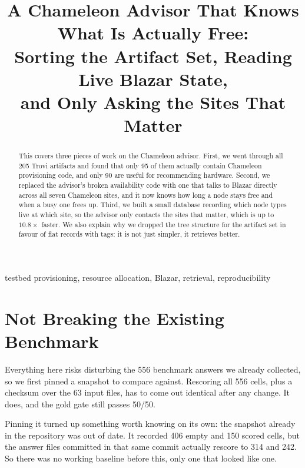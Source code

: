 \documentclass[conference]{IEEEtran}
\begin{document}
\title{A Chameleon Advisor That Knows What Is Actually Free:\\
Sorting the Artifact Set, Reading Live Blazar State,\\
and Only Asking the Sites That Matter}

\author{
}

\maketitle

\begin{abstract}
This covers three pieces of work on the Chameleon advisor. First, we went
through all 205 Trovi artifacts and found that only 95 of them actually contain
Chameleon provisioning code, and only 90 are useful for recommending hardware.
Second, we replaced the advisor's broken availability code with one that talks
to Blazar directly across all seven Chameleon sites, and it now knows how long
a node stays free and when a busy one frees up. Third, we built a small
database recording which node types live at which site, so the advisor only
contacts the sites that matter, which is up to $10.8\times$ faster. We also
explain why we dropped the tree structure for the artifact set in favour of
flat records with tags: it is not just simpler, it retrieves better.
\end{abstract}

\begin{IEEEkeywords}
testbed provisioning, resource allocation, Blazar, retrieval, reproducibility
\end{IEEEkeywords}

\section{Not Breaking the Existing Benchmark}

Everything here risks disturbing the 556 benchmark answers we already
collected, so we first pinned a snapshot to compare against. Rescoring all 556
cells, plus a checksum over the 63 input files, has to come out identical after
any change. It does, and the gold gate still passes 50/50.

Pinning it turned up something worth knowing on its own: the snapshot already
in the repository was out of date. It recorded 406 empty and 150 scored cells,
but the answer files committed in that same commit actually rescore to 314 and
242. So there was no working baseline before this, only one that looked like
one.
\end{document}
